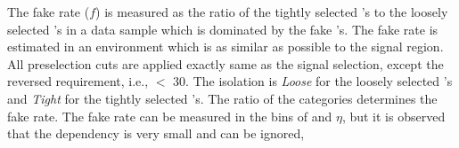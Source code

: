 The fake rate ($f$) is measured as the ratio of the tightly selected \Tau's to the loosely 
selected \Tau's in a data sample which is dominated by the fake \Tau's. The fake rate is estimated in an environment which is as 
similar as possible to the signal region. 
All preselection cuts are applied exactly same as the signal selection,  except the reversed \MPT requirement, i.e., \MPT $<$ 30\GeV.
The \Tau isolation is {\it Loose} for the loosely selected \Tau's and {\it Tight} for the tightly selected \Tau's.
The ratio of the  categories determines the fake rate. 
The fake rate can be measured in the bins of \Tau \pt and $\eta$, but it is observed that the dependency is very small and can be ignored, 
